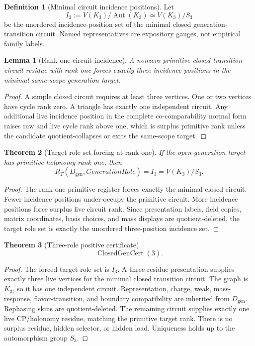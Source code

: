 \documentclass[11pt]{article}
\newcommand{\Dgen}{D_{\mathrm{gen}}}
\newcommand{\ClosedGenCert}{\operatorname{ClosedGenCert}}
\newcommand{\Aut}{\operatorname{Aut}}
\theoremstyle{definition}
\newtheorem{definition}{Definition}[section]
\theoremstyle{plain}
\newtheorem{theorem}{Theorem}[section]
\newtheorem{lemma}[theorem]{Lemma}
\theoremstyle{remark}
\begin{document}
\begin{definition}[Minimal circuit incidence positions]
Let
\[
I_3:=V(K_3)/\Aut(K_3)\simeq V(K_3)/S_3
\]
be the unordered incidence-position set of the minimal closed generation-transition circuit. Named representatives are expository gauges, not empirical family labels.
\end{definition}

\begin{lemma}[Rank-one circuit incidence]
A nonzero primitive closed transition-circuit residue with rank one forces exactly three incidence positions in the minimal same-scope generation target.
\end{lemma}
\begin{proof}
A simple closed circuit requires at least three vertices. One or two vertices have cycle rank zero. A triangle has exactly one independent circuit. Any additional live incidence position in the complete co-comparability normal form raises raw and live cycle rank above one, which is surplus primitive rank unless the candidate quotient-collapses or exits the same-scope target.
\end{proof}

\begin{theorem}[Target role set forcing at rank one]
If the open-generation target has primitive holonomy rank one, then
\[
R_T(\Dgen,GenerationRole)=I_3=V(K_3)/S_3.
\]
\end{theorem}
\begin{proof}
The rank-one primitive register forces exactly the minimal closed circuit. Fewer incidence positions under-occupy the primitive circuit. More incidence positions force surplus live circuit rank. Since presentation labels, field copies, matrix coordinates, basis choices, and mass displays are quotient-deleted, the target role set is exactly the unordered three-position incidence set.
\end{proof}

\begin{theorem}[Three-role positive certificate]
\[
\ClosedGenCert(3).
\]
\end{theorem}
\begin{proof}
The forced target role set is \(I_3\). A three-residue presentation supplies exactly three live vertices for the minimal closed transition circuit. The graph is \(K_3\), so it has one independent circuit. Representation, charge, weak, mass-response, flavor-transition, and boundary compatibility are inherited from \(\Dgen\). Rephasing skins are quotient-deleted. The remaining circuit supplies exactly one live CP/holonomy residue, matching the primitive target rank. There is no surplus residue, hidden selector, or hidden load. Uniqueness holds up to the automorphism group \(S_3\).
\end{proof}
\end{document}
